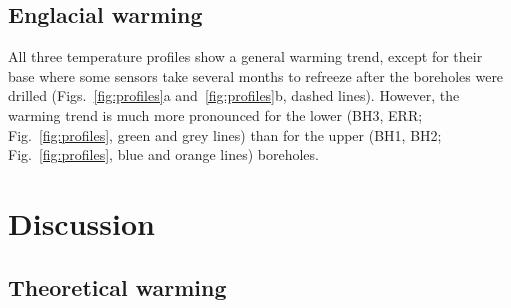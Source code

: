 \documentclass[utf8]{article}
\begin{document}
\subsection{Englacial warming}

    All three temperature profiles show a general warming trend, except for
    their base where some sensors take several months to refreeze after the
    boreholes were drilled (Figs.~\ref{fig:profiles}a and~\ref{fig:profiles}b,
    dashed lines). However, the warming trend is much more pronounced for the
    lower (BH3, ERR; Fig.~\ref{fig:profiles}, green and grey lines) than for
    the upper (BH1, BH2; Fig.~\ref{fig:profiles}, blue and orange lines)
    boreholes.


\section{Discussion}

\subsection{Theoretical warming}
\end{document}
